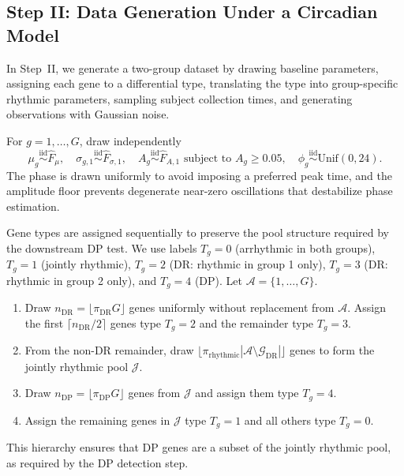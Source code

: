 \documentclass{article}
\begin{document}
\subsection{Step II: Data Generation Under a Circadian Model}
\label{sec:generative}

In Step~II, we generate a two-group dataset by drawing baseline parameters,
assigning each gene to a differential type, translating the type into
group-specific rhythmic parameters, sampling subject collection times, and
generating observations with Gaussian noise.

For $g=1,\ldots,G$, draw independently
\begin{equation}
\mu_g \overset{\mathrm{iid}}{\sim}\hat{F}_\mu,\quad
\sigma_{g,1} \overset{\mathrm{iid}}{\sim}\hat{F}_{\sigma,1},\quad
A_g \overset{\mathrm{iid}}{\sim}\hat{F}_{A,1}\text{ subject to }A_g\geq 0.05,\quad
\phi_g \overset{\mathrm{iid}}{\sim}\mathrm{Unif}(0,24).
\label{eq:layer1}
\end{equation}
The phase is drawn uniformly to avoid imposing a preferred peak time, and the
amplitude floor prevents degenerate near-zero oscillations that destabilize
phase estimation.

Gene types are assigned sequentially to preserve the pool structure required by
the downstream DP test. We use labels $T_g=0$ (arrhythmic in both groups),
$T_g=1$ (jointly rhythmic), $T_g=2$ (DR: rhythmic in group 1 only),
$T_g=3$ (DR: rhythmic in group 2 only), and $T_g=4$ (DP). Let
$\mathcal{A}=\{1,\ldots,G\}$.

\begin{enumerate}
\item Draw $n_{\mathrm{DR}}=\lfloor\pi_{\mathrm{DR}}G\rfloor$ genes uniformly
without replacement from $\mathcal{A}$. Assign the first
$\lceil n_{\mathrm{DR}}/2\rceil$ genes type $T_g=2$ and the remainder type
$T_g=3$.
\item From the non-DR remainder, draw
$\lfloor\pi_{\mathrm{rhythmic}}|\mathcal{A}\setminus\mathcal{G}_{\mathrm{DR}}|\rfloor$
genes to form the jointly rhythmic pool $\mathcal{J}$.
\item Draw $n_{\mathrm{DP}}=\lfloor\pi_{\mathrm{DP}}G\rfloor$ genes from
$\mathcal{J}$ and assign them type
$T_g=4$.
\item Assign the remaining genes in $\mathcal{J}$ type $T_g=1$ and all others
type $T_g=0$.
\end{enumerate}

This hierarchy ensures that DP genes are a subset of the jointly rhythmic pool,
as required by the DP detection step.
\end{document}
